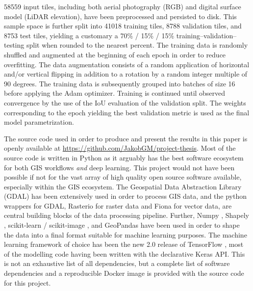 
\num{58559} input tiles, including both aerial photography (RGB) and digital surface model (LiDAR elevation), have been preprocessed and persisted to disk.
This sample space is further split into \num{41018} training tiles, \num{8788} validation tiles, and \num{8753} test tiles, yielding a customary a 70\% / 15\% / 15\% training--validation--testing split when rounded to the nearest percent.
The training data is randomly shuffled and augmented at the beginning of each epoch in order to reduce overfitting.
The data augmentation consists of a random application of horizontal and/or vertical flipping in addition to a rotation by a random integer multiple of 90 degrees.
The training data is subsequently grouped into batches of size 16 before applying the Adam optimizer.
Training is continued until observed convergence by the use of the IoU evaluation of the validation split.
The weights corresponding to the epoch yielding the best validation metric is used as the final model parametrization.


The source code used in order to produce and present the results in this paper is openly available at \url{https://github.com/JakobGM/project-thesis}.
Most of the source code is written in Python as it arguably has the best software ecosystem for both GIS workflows \emph{and} deep learning.
This project would not have been possible if not for the vast array of high quality open source software available, especially within the GIS ecosystem.
The Geospatial Data Abstraction Library (GDAL) \cite{dep:gdal} has been extensively used in order to process GIS data, and the python wrappers for GDAL, Rasterio \cite{dep:rasterio} for raster data and Fiona \cite{dep:fiona} for vector data, are central building blocks of the data processing pipeline.
Further, Numpy \cite{dep:numpy}, Shapely \cite{dep:shapely}, scikit-learn \cite{dep:sklearn} / scikit-image \cite{dep:sklearn}, and GeoPandas \cite{dep:geopandas} have been used in order to shape the data into a final format suitable for machine learning purposes.
The machine learning framework of choice has been the new 2.0 release of TensorFlow \cite{dep:tensorflow}, most of the modelling code having been written with the declarative Keras API.
This is not an exhaustive list of all dependencies, but a complete list of software dependencies and a reproducible Docker \cite{dep:docker} image is provided with the source code for this project.

